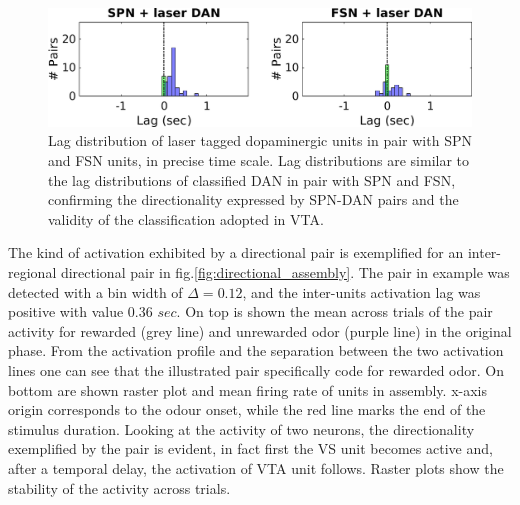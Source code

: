 \begin{figure}[H]
\centering
\includegraphics[scale=0.5]{figures/LagSecLaser3VS.png}
\caption{Lag distribution of laser tagged dopaminergic units in pair with SPN and FSN units, in precise time scale. Lag distributions are similar to the lag distributions of classified DAN in pair with SPN and FSN, confirming the directionality expressed by SPN-DAN pairs and the validity of the classification adopted in VTA.}
\label{fig:LagInSecLaser}
\end{figure}
The kind of activation exhibited by a directional pair is exemplified for an inter-regional directional pair in fig.\ref{fig:directional_assembly}. The pair in example was detected with a bin width of $\Delta = 0.12$, and the inter-units activation lag was positive with value 0.36 $sec$. On top is shown the mean across trials of the pair activity for rewarded (grey line) and unrewarded odor (purple line) in the original phase. From the activation profile and the separation between the two activation lines one can see that the illustrated pair specifically code for rewarded odor. On bottom are shown raster plot and mean firing rate of units in assembly. x-axis origin corresponds to the odour onset, while the red line marks the end of the stimulus duration.
Looking at the activity of two neurons, the directionality exemplified by the pair is evident, in fact first the VS unit becomes active and, after a temporal delay, the activation of VTA unit follows. Raster plots show the stability of the activity across trials.\\ 

